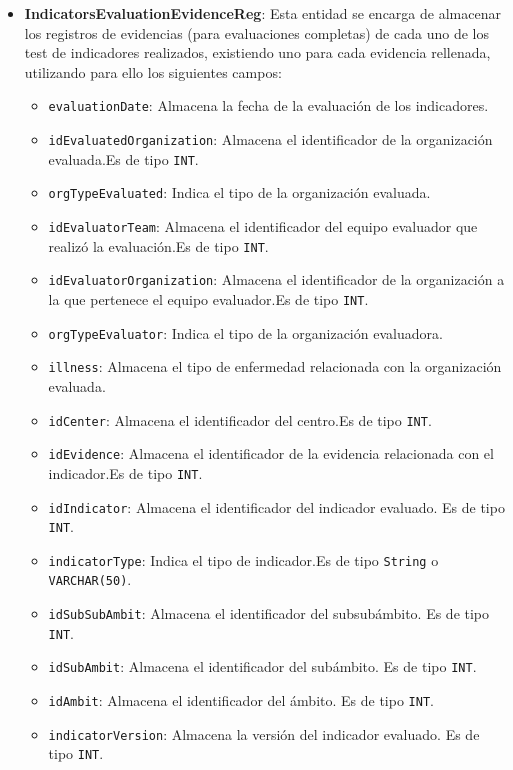\begin{itemize}
    \item \textbf{IndicatorsEvaluationEvidenceReg}: Esta entidad se encarga de almacenar los registros de evidencias (para evaluaciones completas) de cada uno de los test de indicadores realizados, existiendo uno para cada evidencia rellenada, utilizando para ello los siguientes campos:
    \begin{itemize}
      \item \texttt{evaluationDate}: Almacena la fecha de la evaluación de los indicadores.
      \item \texttt{idEvaluatedOrganization}: Almacena el identificador de la organización evaluada.Es de tipo \texttt{INT}.
      \item \texttt{orgTypeEvaluated}: Indica el tipo de la organización evaluada.
      \item \texttt{idEvaluatorTeam}: Almacena el identificador del equipo evaluador que realizó la evaluación.Es de tipo \texttt{INT}.
      \item \texttt{idEvaluatorOrganization}: Almacena el identificador de la organización a la que pertenece el equipo evaluador.Es de tipo \texttt{INT}.
      \item \texttt{orgTypeEvaluator}: Indica el tipo de la organización evaluadora.
      \item \texttt{illness}: Almacena el tipo de enfermedad relacionada con la organización evaluada.
      \item \texttt{idCenter}: Almacena el identificador del centro.Es de tipo \texttt{INT}.
      \item \texttt{idEvidence}: Almacena el identificador de la evidencia relacionada con el indicador.Es de tipo \texttt{INT}.
      \item \texttt{idIndicator}: Almacena el identificador del indicador evaluado. Es de tipo \texttt{INT}.
      \item \texttt{indicatorType}: Indica el tipo de indicador.Es de tipo \texttt{String} o \texttt{VARCHAR(50)}.
      \item \texttt{idSubSubAmbit}: Almacena el identificador del subsubámbito. Es de tipo \texttt{INT}.
      \item \texttt{idSubAmbit}: Almacena el identificador del subámbito. Es de tipo \texttt{INT}.
      \item \texttt{idAmbit}: Almacena el identificador del ámbito. Es de tipo \texttt{INT}.
      \item \texttt{indicatorVersion}: Almacena la versión del indicador evaluado. Es de tipo \texttt{INT}.

\end{itemize}
\end{itemize}
